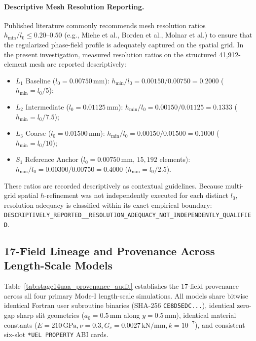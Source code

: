 \paragraph{Descriptive Mesh Resolution Reporting.}
Published literature commonly recommends mesh resolution ratios $h_{\min}/l_0 \le 0.20\text{--}0.50$ (e.g., Miehe et al., Borden et al., Molnar et al.) to ensure that the regularized phase-field profile is adequately captured on the spatial grid. In the present investigation, measured resolution ratios on the structured 41,912-element mesh are reported descriptively:
\begin{itemize}
  \item $L_1$ Baseline ($l_0 = 0.00750\,\mathrm{mm}$): $h_{\min}/l_0 = 0.00150 / 0.00750 = 0.2000$ ($h_{\min} = l_0/5$);
  \item $L_2$ Intermediate ($l_0 = 0.01125\,\mathrm{mm}$): $h_{\min}/l_0 = 0.00150 / 0.01125 = 0.1333$ ($h_{\min} = l_0/7.5$);
  \item $L_3$ Coarse ($l_0 = 0.01500\,\mathrm{mm}$): $h_{\min}/l_0 = 0.00150 / 0.01500 = 0.1000$ ($h_{\min} = l_0/10$);
  \item $S_1$ Reference Anchor ($l_0 = 0.00750\,\mathrm{mm}$, $15{,}192$ elements): $h_{\min}/l_0 = 0.00300 / 0.00750 = 0.4000$ ($h_{\min} = l_0/2.5$).
\end{itemize}
These ratios are recorded descriptively as contextual guidelines. Because multi-grid spatial $h$-refinement was not independently executed for each distinct $l_0$, resolution adequacy is classified within its exact empirical boundary: \texttt{DESCRIPTIVELY\_REPORTED\_\_RESOLUTION\_ADEQUACY\_NOT\_INDEPENDENTLY\_QUALIFIED}.

\subsection{17-Field Lineage and Provenance Across Length-Scale Models}
\label{subsec:stage14uaa_provenance_table}

Table~\ref{tab:stage14uaa_provenance_audit} establishes the 17-field provenance across all four primary Mode-I length-scale simulations. All models share bitwise identical Fortran user subroutine binaries (SHA-256 \texttt{CE8D5EDC...}), identical zero-gap sharp slit geometries ($a_0 = 0.5\,\mathrm{mm}$ along $y = 0.5\,\mathrm{mm}$), identical material constants ($E = 210\,\mathrm{GPa}, \nu = 0.3, G_c = 0.0027\,\mathrm{kN/mm}, k = 10^{-7}$), and consistent six-slot \texttt{*UEL PROPERTY} ABI cards.

